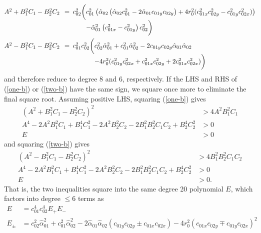 \documentclass[11pt]{article}
\newcommand{\halpha}{\hat{\alpha}}
\begin{document}
\begin{align*}
\begin{array}{@{}r} A^2 + B_1^2 C_1 - B_2^2 C_2 \phantom{\bigg(} \hspace{-.3em}= \\ \phantom{\bigg(} \end{array}&%
\begin{array}{@{}r@{}l@{}} c_{02}^2 \bigg(& c_{01}^2 \left(\halpha_{02} \left(\halpha_{02} c_{01}^2 - 2 \halpha_{01} c_{01y} c_{02y}\right)
  + 4 r_0^2 (c_{01x}^2 c_{02y}^2 - c_{01y}^2 c_{02x}^2)\right) \\
  &- \halpha_{01}^2 \left(c_{01x}^2 - c_{01y}^2\right) c_{02}^2 \bigg) \end{array} \\
\begin{array}{@{}r} A^2 - B_1^2 C_1 - B_2^2 C_2 \phantom{\bigg(} \hspace{-.3em}= \\ \phantom{\bigg(} \end{array}&%
\begin{array}{@{}r@{}l@{}} c_{01}^2 c_{02}^2 \bigg(& c_{02}^2 \halpha_{01}^2 + c_{01}^2 \halpha_{02}^2 - 2 c_{01y} c_{02y} \halpha_{01} \halpha_{02} \\
  &- 4 r_0^2 (c_{01y}^2 c_{02x}^2 + c_{01x}^2 c_{02y}^2 + 2c_{01x}^2 c_{02x}^2) \bigg) \end{array}
\end{align*}
and therefore reduce to degree 8 and 6, respectively.  If the LHS and RHS of (\ref{one-b}) or (\ref{two-b}) have the same sign, we square once
more to eliminate the final square root.  Assuming positive LHS, squaring (\ref{one-b}) gives
\begin{align*}
(A^2 + B_1^2 C_1 - B_2^2 C_2)^2 &> 4 A^2 B_1^2 C_1 \\
A^4 - 2A^2 B_1^2 C_1 + B_1^4 C_1^2 - 2 A^2 B_2^2 C_2 - 2 B_1^2 B_2^2 C_1 C_2 + B_2^4 C_2^2 &> 0 \\
E &> 0 
\end{align*}
and squaring (\ref{two-b}) gives
\begin{align*}
(A^2 - B_1^2 C_1 - B_2^2 C_2)^2 &> 4 B_1^2 B_2^2 C_1 C_2 \\
A^4 - 2A^2 B_1^2 C_1 + B_1^4 C_1^2 - 2 A^2 B_2^2 C_2 - 2 B_1^2 B_2^2 C_1 C_2 + B_2^4 C_2^2 &> 0 \\
E &> 0.
\end{align*}
That is, the two inequalities square into the same degree 20 polynomial $E$, which factors into degree $\le 6$ terms as
\begin{align*}
E &= c_{01}^4 c_{02}^4 E_+ E_- \\
E_\pm &= c_{02}^2 \halpha_{01}^2 + c_{01}^2 \halpha_{02}^2 - 2 \halpha_{01} \halpha_{02} (c_{01y} c_{02y} \pm c_{01x} c_{02x}) - 4 r_0^2 (c_{01x} c_{02y} \mp c_{01y} c_{02x})^2
\end{align*}
\end{document}
